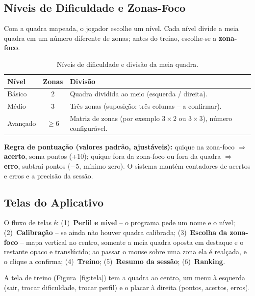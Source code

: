 \documentclass[a4paper,11pt]{article}
\begin{document}
\subsection{Níveis de Dificuldade e Zonas-Foco}
Com a quadra mapeada, o jogador escolhe um nível. Cada nível divide a meia quadra em um número diferente de zonas; antes do treino, escolhe-se a \textbf{zona-foco}.

\begin{table}[H]
\centering
\small
\renewcommand{\arraystretch}{1.25}
\caption{Níveis de dificuldade e divisão da meia quadra.}
\label{tab:niveis}
\begin{tabularx}{\textwidth}{l c X}
\toprule
\textbf{Nível} & \textbf{Zonas} & \textbf{Divisão} \\
\midrule
Básico & 2 & Quadra dividida ao meio (esquerda / direita). \\
\rowcolor{rowgray}
Médio & 3 & Três zonas (suposição: três colunas -- a confirmar). \\
Avançado & $\geq 6$ & Matriz de zonas (por exemplo $3\times 2$ ou $3\times 3$), número configurável. \\
\bottomrule
\end{tabularx}
\end{table}

\textbf{Regra de pontuação (valores padrão, ajustáveis):} quique na zona-foco $\Rightarrow$ \textbf{acerto}, soma pontos (+10); quique fora da zona-foco ou fora da quadra $\Rightarrow$ \textbf{erro}, subtrai pontos ($-5$, mínimo zero). O sistema mantém contadores de acertos e erros e a precisão da sessão.

\subsection{Telas do Aplicativo}
O fluxo de telas é: (1)~\textbf{Perfil e nível} -- o programa pede um nome e o nível; (2)~\textbf{Calibração} -- se ainda não houver quadra calibrada; (3)~\textbf{Escolha da zona-foco} -- mapa vertical no centro, somente a meia quadra oposta em destaque e o restante opaco e translúcido; ao passar o mouse sobre uma zona ela é realçada, e o clique a confirma; (4)~\textbf{Treino}; (5)~\textbf{Resumo da sessão}; (6)~\textbf{Ranking}.

A tela de treino (Figura~\ref{fig:tela}) tem a quadra ao centro, um menu à esquerda (sair, trocar dificuldade, trocar perfil) e o placar à direita (pontos, acertos, erros).
\end{document}
